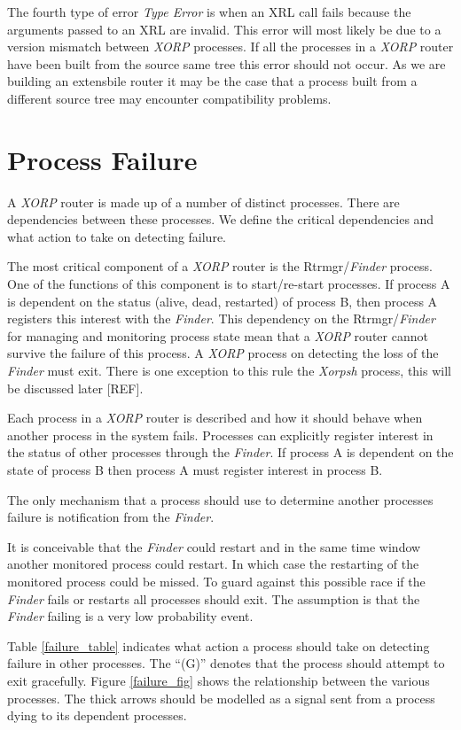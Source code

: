 \documentclass[11pt]{article}
\makeatletter
\newcommand{\xorp} {{\em XORP}\@\xspace}
\newcommand{\finder} {{\em Finder}\@\xspace}
\newcommand{\xorpsh} {{\em Xorpsh}\@\xspace}
\makeatother
\begin{document}
The fourth type of error {\em Type Error} is when an XRL call fails
because the arguments passed to an XRL are invalid. This error will
most likely be due to a version mismatch between \xorp processes. If
all the processes in a \xorp router have been built from the source
same tree this error should not occur. As we are building an
extensbile router it may be the case that a process built from a
different source tree may encounter compatibility problems.

\section{\label{pfailure}Process Failure}

A \xorp router is made up of a number of distinct processes. There are
dependencies between these processes. We define the critical
dependencies and what action to take on detecting failure.

The most critical component of a \xorp router is the Rtrmgr/\finder
process. One of the functions of this component is to start/re-start
processes. If process A is dependent on the status (alive, dead,
restarted) of process B, then process A registers this interest with
the \finder. This dependency on the Rtrmgr/\finder for managing and
monitoring process state mean that a \xorp router cannot survive the
failure of this process. A \xorp process on detecting the loss of the
\finder must exit. There is one exception to this rule the \xorpsh
process, this will be discussed later [REF].

Each process in a \xorp router is described and how it should behave
when another process in the system fails. Processes can explicitly
register interest in the status of other processes through the
\finder. If process A is dependent on the state of process B then
process A must register interest in process B.

The only mechanism that a process should use to determine another
processes failure is notification from the \finder.

It is conceivable that the \finder could restart and in the same time
window another monitored process could restart. In which case the
restarting of the monitored process could be missed. To guard against
this possible race if the \finder fails or restarts all processes
should exit. The assumption is that the \finder failing is a very low
probability event.

Table \ref{failure_table} indicates what action a process should take
on detecting failure in other processes. The ``(G)'' denotes that the
process should attempt to exit gracefully. Figure \ref{failure_fig}
shows the relationship between the various processes. The thick arrows
should be modelled as a signal sent from a process dying to its
dependent processes.
\end{document}

